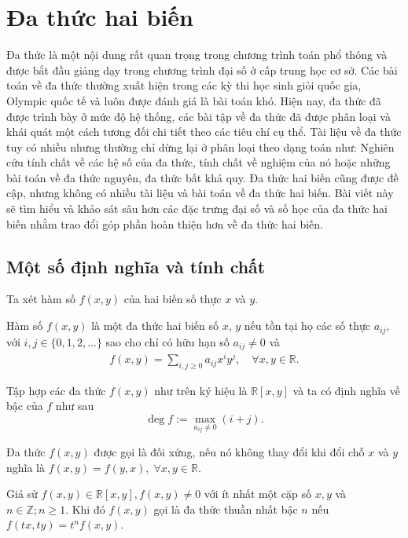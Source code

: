 \section{Đa thức hai biến}
\noindent Đa thức là một nội dung rất quan trọng trong chương trình toán phổ thông và được bắt đầu giảng dạy trong chương trình đại số ở cấp trung học cơ sở.
Các bài toán về đa thức thường xuất hiện trong các kỳ thi học sinh giỏi quốc gia, Olympic quốc tế và luôn được đánh giá là bài toán khó.
Hiện nay, đa thức đã được trình bày ở mức độ hệ thống, các bài tập về đa thức đã được phân loại và khái quát một cách tương đối chi tiết theo các tiêu chí cụ thể. Tài liệu về đa thức tuy có nhiều nhưng thường chỉ dừng lại ở phân loại theo dạng toán như: Nghiên cứu tính chất về các hệ số của đa thức, tính chất về nghiệm của nó hoặc những bài toán về đa thức nguyên, đa thức bất khả quy. 
Đa thức hai biến cũng được đề cập, nhưng không có nhiều tài liệu và bài toán về đa thức hai biến.
Bài viết này sẽ tìm hiểu và khảo sát sâu hơn các đặc trưng đại số và số học của đa thức hai biến nhằm  trao đổi góp phần hoàn thiện hơn về đa thức hai biến.

\subsection{Một số định nghĩa và tính chất}	
\noindent Ta xét hàm số $f(x, y)$  của hai biến số thực  $x$ và $y$.

\begin{dn}
	Hàm số $f(x, y)$ là một đa thức hai biến số $x$, $y$ nếu tồn tại họ các số thực $a_{ij}$, với $i,j\in \{0,1,2,\hdots\}$ sao cho chỉ có hữu hạn số $a_{ij}\ne 0$ và 
	\begin{align*}
	f(x,y)=\sum_{i,j\ge 0}a_{ij}x^iy^j, \quad\forall x,y\in \mathbb{R}.
	\end{align*}
\end{dn}
Tập hợp các đa thức $f(x,y)$ như trên ký hiệu là $\mathbb{R}[x,y]$  và ta có định nghĩa về bậc của $f$ như sau $$\deg f:=  \max_{a_{ij}\ne 0}(i+j).$$

\begin{dn}
Đa thức $f(x,y)$  được gọi là đối xứng, nếu nó không thay đổi khi đổi chỗ $x$ và $y$  nghĩa là  $f(x,y)=f(y,x),\;\forall x,y\in \mathbb{R}$.
\end{dn}

\begin{dn}
Giả sử $f(x,y)\in \mathbb{R}[x,y],f(x,y)\ne 0$  với ít nhất một cặp số $x,y$ và $n\in\mathbb{Z}; n\ge 1$. Khi đó $f(x,y)$ gọi là đa thức thuần nhất bậc $n$  nếu $f(tx,ty)=t^nf(x,y)$.
\end{dn}

